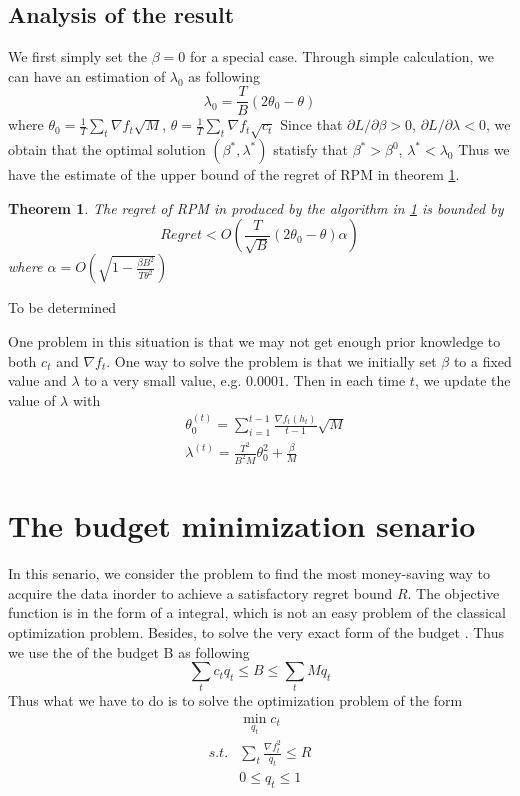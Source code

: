 \documentclass[10pt,conference,compsocconf,letterpaper]{IEEEtran}
\newtheorem{theorem}{Theorem}
\begin{document}
\subsection{Analysis of the result}
We first simply set the $\beta=0$ for a special case. Through simple calculation, we can have an estimation of $\lambda_0$ as following
\begin{equation}
\lambda_0=\frac{T}{B}(2\theta_0-\theta)
\end{equation}
where $\theta_0=\frac{1}{T}\sum_t \nabla f_t\sqrt{M}$, $\theta=\frac{1}{T}\sum_t \nabla f_t\sqrt{c_t}$
Since that $\partial L/\partial \beta >0$, $\partial L/\partial \lambda <0$, we obtain that the optimal solution $(\beta^*,\lambda^*)$ statisfy that $\beta^*>\beta^0$, $\lambda^*<\lambda_0$ Thus we have the estimate of the upper bound of the regret of RPM in theorem \ref{thm:reg-bnd}.
\begin{theorem}\label{thm:reg-bnd}
The regret of RPM in produced by the algorithm in \ref{} is bounded by
\begin{equation}
Regret<O(\frac{T}{\sqrt{B}}(2\theta_0-\theta)\alpha)
\end{equation}
where $\alpha=O(\sqrt{1-\frac{\beta B^2}{T\theta^2}})$
\end{theorem}
\begin{IEEEproof}
To be determined
\end{IEEEproof}
One problem in this situation is that we may not get enough prior knowledge to both $c_t$ and $\nabla f_t$. One way to solve the problem is that we initially set $\beta$ to a fixed value and $\lambda$ to a very small value, e.g. $0.0001$.  Then in each time $t$, we update the value of $\lambda$ with 
\begin{align}
&\theta_0^{(t)}=\sum_{i=1}^{t-1}\frac{\nabla f_t(h_t)}{t-1}\sqrt{M}\\
&\lambda^{(t)}=\frac{T^2}{B^2M}\theta_0^2+\frac{\beta}{M}
\end{align}


\section{The budget minimization senario}
In this senario, we consider the problem to find the most money-saving way to acquire the data inorder to achieve a satisfactory regret bound $R$. The objective function is in the form of a integral, which is not an easy problem of the classical optimization problem. Besides, to solve the very exact form of the budget . Thus we use the of the budget B as following
\begin{equation}
\sum_t c_t q_t \leq B \leq \sum_t Mq_t
\end{equation}
Thus what we have to do is to solve the optimization problem of the form
\begin{equation}
\begin{aligned}
&\min_{q_t} c_t\\
s.t. &\sum_t \frac{\nabla f_t^2}{q_t}\leq R\\
	&0\leq q_t \leq 1
\end{aligned}
\end{equation}
\end{document}
